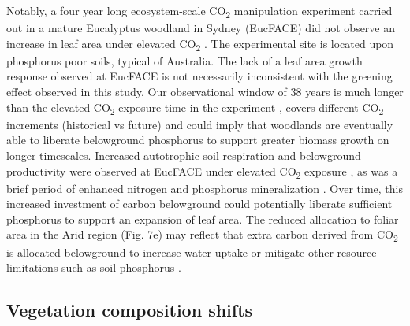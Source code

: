 \documentclass[gc, manuscript]{copernicus}
\begin{document}
Notably, a four year long ecosystem-scale CO\textsubscript{2}
manipulation experiment carried out in a mature Eucalyptus woodland in
Sydney (EucFACE) did not observe an increase in leaf area under elevated
CO\textsubscript{2} \citep{jiangFateCarbonMature2020b}. The experimental
site is located upon phosphorus poor soils, typical of Australia. The
lack of a leaf area growth response observed at EucFACE is not
necessarily inconsistent with the greening effect observed in this
study. Our observational window of 38 years is much longer than the
elevated CO\textsubscript{2} exposure time in the experiment \citep[four
years in][]{jiangFateCarbonMature2020b}, covers different
CO\textsubscript{2} increments (historical vs future) and could imply
that woodlands are eventually able to liberate belowground phosphorus to
support greater biomass growth on longer timescales. Increased
autotrophic soil respiration and belowground productivity were observed
at EucFACE under elevated CO\textsubscript{2} exposure
\citep{drakeShorttermCarbonCycling2016, jiangFateCarbonMature2020b}, as
was a brief period of enhanced nitrogen and phosphorus mineralization
\citep{hasegawaElevatedCarbonDioxide2016}. Over time, this increased
investment of carbon belowground could potentially liberate sufficient
phosphorus to support an expansion of leaf area. The reduced allocation
to foliar area in the Arid region (Fig. 7e) may reflect that extra
carbon derived from CO\textsubscript{2} is allocated belowground to
increase water uptake or mitigate other resource limitations such as
soil phosphorus \citep{jiangLowPhosphorusSupply2020}.

\subsection{Vegetation composition shifts}
\end{document}
